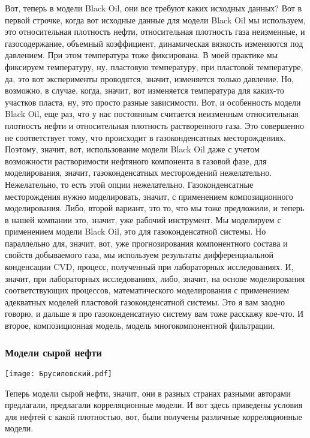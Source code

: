 \documentclass[main.tex]{subfiles}
\begin{document}
Вот, теперь в модели Black Oil, они все требуют каких исходных данных?
Вот в первой строчке, когда вот исходные данные для модели Black Oil мы используем, это относительная плотность нефти, относительная плотность газа неизменные, и газосодержание, объемный коэффициент, динамическая вязкость изменяются под давлением.
При этом температура тоже фиксирована.
В моей практике мы фиксируем температуру, ну, пластовую температуру, при пластовой температуре, да, это вот эксперименты проводятся, значит, изменяется только давление.
Но, возможно, в случае, когда, значит, вот изменяется температура для каких-то участков пласта, ну, это просто разные зависимости.
Вот, и особенность модели Black Oil, еще раз, что у нас постоянным считается неизменным относительная плотность нефти и относительная плотность растворенного газа.
Это совершенно не соответствует тому, что происходит в газоконденсатных месторождениях.
Поэтому, значит, вот, использование модели Black Oil даже с учетом возможности растворимости нефтяного компонента в газовой фазе, для моделирования, значит, газоконденсатных месторождений нежелательно.
Нежелательно, то есть этой опции нежелательно.
Газоконденсатные месторождения нужно моделировать, значит, с применением композиционного моделирования.
Либо, второй вариант, это то, что мы тоже предложили, и теперь в нашей компании это, значит, уже рабочий инструмент.
Мы моделируем с применением модели Black Oil, это для газоконденсатной системы.
Но параллельно для, значит, вот, уже прогнозирования компонентного состава и свойств добываемого газа, мы используем результаты дифференциальной конденсации CVD, процесс, полученный при лабораторных исследованиях.
И, значит, при лабораторных исследованиях, либо, значит, на основе моделирования соответствующих процессов, математического моделирования с применением адекватных моделей пластовой газоконденсатной системы.
Это я вам заодно говорю, и дальше я про газоконденсатную систему вам тоже расскажу кое-что.
И второе, композиционная модель, модель многокомпонентной фильтрации.

\subsubsection{Модели сырой нефти}

\begin{center}
\texttt{[image: Брусиловский.pdf]}
\end{center}

Теперь модели сырой нефти, значит, они в разных странах разными авторами предлагали, предлагали корреляционные модели.
И вот здесь приведены условия для нефтей с какой плотностью, вот, были получены различные корреляционные модели.
\end{document}
